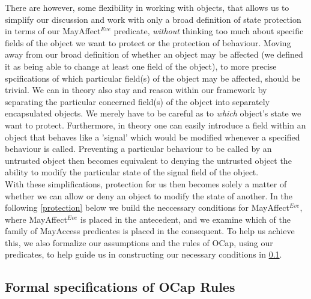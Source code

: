 \documentclass[a4paper,11pt, twoside,twocolumn]{article}
\begin{document}
There are however, some flexibility in working with objects, that allows us to simplify our discussion and work with only a broad definition of state protection in terms of our MayAffect$^{Eve}$ predicate, \textit{without} thinking too much about specific fields of the object we want to protect or the protection of behaviour. Moving away from our broad definition of whether an object may be affected (we defined it as being able to change at least one field of the object), to more precise spcifications of which particular field(s) of the object may be affected, should be trivial. We can in theory also stay and reason within our framework by separating the particular concerned field(s) of the object into separately encapsulated objects. We merely have to be careful as to \textit{which} object's state we want to protect. Furthermore, in theory one can easily introduce a field within an object that behaves like a 'signal' which would be modified whenever a specified behaviour is called. Preventing a particular behaviour to be called by an untrusted object then becomes equivalent to denying the untrusted object the ability to modify the particular state of the signal field of the object.\\

With these simplifications, protection for us then becomes solely a matter of whether we can allow or deny an object to modify the state of another. In the following \ref{protection} below we build the neccessary conditions for MayAffect$^{Eve}$, where MayAffect$^{Eve}$ is placed in the antecedent, and we examine which of the family of MayAccess predicates is placed in the consequent. To help us achieve this, we also formalize our assumptions and the rules of OCap, using our predicates, to help guide us in constructing our necessary conditions in \ref{ocaprules}.

\subsection{Formal specifications of OCap Rules}\label{ocaprules}
\end{document}
